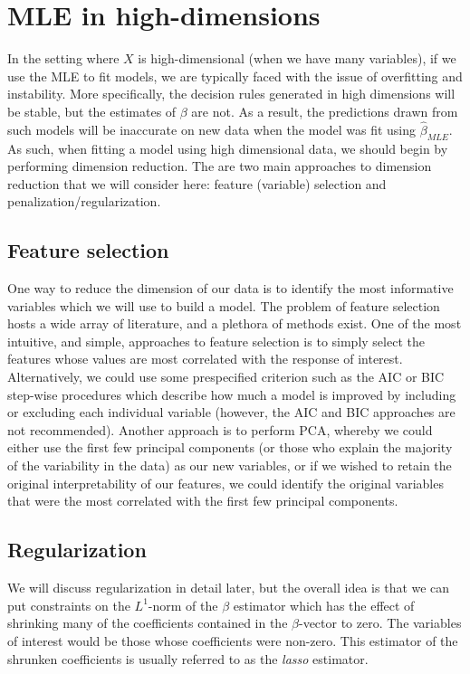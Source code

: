 \section{MLE in high-dimensions}

In the setting where $X$ is high-dimensional (when we have many variables), if we use the MLE to fit models, we are typically faced with the issue of overfitting and instability. More specifically, the decision rules generated in high dimensions will be stable, but the estimates of $\beta$ are not. As a result, the predictions drawn from such models will be inaccurate on new data when the model was fit using $\hat{\beta}_{MLE}$. As such, when fitting a model using high dimensional data, we should begin by performing dimension reduction. The are two main approaches to dimension reduction that we will consider here: feature (variable) selection and penalization/regularization.

\subsection{Feature selection}

One way to reduce the dimension of our data is to identify the most informative variables which we will use to build a model. The problem of feature selection hosts a wide array of literature, and a plethora of methods exist. One of the most intuitive, and simple, approaches to feature selection is to simply select the features whose values are most correlated with the response of interest. Alternatively, we could use some prespecified criterion such as the AIC or BIC step-wise procedures which describe how much a model is improved by including or excluding each individual variable (however, the AIC and BIC approaches are not recommended). Another approach is to perform PCA, whereby we could either use the first few principal components (or those who explain the majority of the variability in the data) as our new variables, or if we wished to retain the original interpretability of our features, we could identify the original variables that were the most correlated with the first few principal components.





\subsection{Regularization}

We will discuss regularization in detail later, but the overall idea is that we can put constraints on the $L^1$-norm of the $\beta$ estimator which has the effect of shrinking many of the coefficients contained in the $\hat{\beta}$-vector to zero. The variables of interest would be those whose coefficients were non-zero. This estimator of the shrunken coefficients is usually referred to as the \textit{lasso} estimator.



